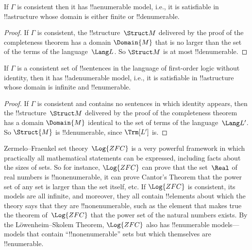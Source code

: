 \begin{thm} 
 If $\Gamma$ is consistent then it has
!!a{enumerable} model, i.e., it is satisfiable in !!a{structure}
whose domain is either finite or !!{denumerable}.
\end{thm}

\begin{proof}
If $\Gamma$ is consistent, the !!{structure}~$\Struct M$ delivered by
the proof of the completeness theorem has a domain $\Domain{M}$ that
is no larger than the set of the terms of the language~$\Lang L$. So
$\Struct M$ is at most !!{denumerable}.
\end{proof}

\begin{thm}
 If $\Gamma$ is a consistent set of !!{sentence}s
in the language of first-order logic without identity, then it has
!!a{denumerable} model, i.e., it is satisfiable in !!a{structure}
whose domain is infinite and !!{enumerable}.
\end{thm}

\begin{proof}
If $\Gamma$ is consistent and contains no sentences in which identity
appears, then the !!{structure}~$\Struct M$ delivered by the proof of
the completeness theorem has a domain $\Domain{M}$ identical to the set
of terms of the language~$\Lang L'$. So $\Struct{M}$ is
!!{denumerable}, since $\Trm[L']$ is.
\end{proof}

\begin{ex}
Zermelo--Fraenkel set theory~$\Log{ZFC}$ is a very powerful framework
in which practically all mathematical statements can be expressed,
including facts about the sizes of sets. So for instance, $\Log{ZFC}$
can prove that the set~$\Real$ of real numbers is !!{nonenumerable},
it can prove Cantor's Theorem that the power set of any set is larger
than the set itself, etc.  If $\Log{ZFC}$ is consistent, its models
are all infinite, and moreover, they all contain !!{element}s about
which the theory says that they are !!{nonenumerable}, such as the
element that makes true the theorem of~$\Log{ZFC}$ that the power set
of the natural numbers exists. By the L\"owenheim--Skolem Theorem,
$\Log{ZFC}$ also has !!{enumerable} models---models that contain
``!!{nonenumerable}'' sets but which themselves are !!{enumerable}.
\end{ex}




\OLEndChapterHook





